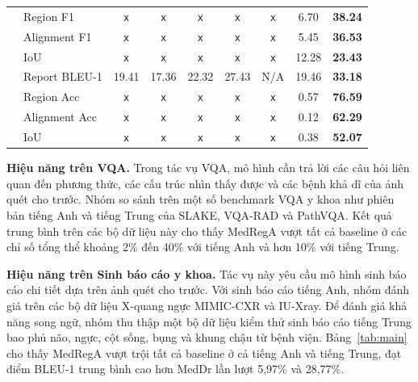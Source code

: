 \documentclass[12pt,a4paper,oneside]{extarticle}
\begin{document}
\begin{table}[H]
\begin{adjustbox}{max width=\textwidth}
\begin{tabular}{llccccccc}
 & Region F1    & \texttt{x} & \texttt{x} & \texttt{x} & \texttt{x} & \texttt{x} & 6.70  & \textbf{38.24} \\
 & Alignment F1 & \texttt{x} & \texttt{x} & \texttt{x} & \texttt{x} & \texttt{x} & 5.45  & \textbf{36.53} \\
 & IoU          & \texttt{x} & \texttt{x} & \texttt{x} & \texttt{x} & \texttt{x} & 12.28 & \textbf{23.43} \\
\midrule
{}
 & Report BLEU-1  & 19.41 & 17.36 & 22.32 & 27.43 & N/A & 19.46 & \textbf{33.18} \\
 & Region Acc     & \texttt{x} & \texttt{x} & \texttt{x} & \texttt{x} & \texttt{x} & 0.57 & \textbf{76.59} \\
 & Alignment Acc  & \texttt{x} & \texttt{x} & \texttt{x} & \texttt{x} & \texttt{x} & 0.12 & \textbf{62.29} \\
 & IoU            & \texttt{x} & \texttt{x} & \texttt{x} & \texttt{x} & \texttt{x} & 0.38 & \textbf{52.07} \\
\bottomrule
\end{tabular}
\end{adjustbox}
\end{table}

\noindent\textbf{Hiệu năng trên VQA.} Trong tác vụ VQA, mô hình cần trả lời các câu hỏi liên
quan đến phương thức, các cấu trúc nhìn thấy được và các bệnh khả dĩ của ảnh quét cho trước.
Nhóm so sánh trên một số benchmark VQA y khoa như phiên bản tiếng Anh và tiếng Trung của SLAKE,
VQA-RAD và PathVQA. Kết quả trung bình trên các bộ dữ liệu này cho thấy MedRegA vượt tất cả
baseline ở các chỉ số tổng thể khoảng 2\% đến 40\% với tiếng Anh và hơn 10\% với tiếng Trung.

\noindent\textbf{Hiệu năng trên Sinh báo cáo y khoa.} Tác vụ này yêu cầu mô hình sinh báo cáo
chi tiết dựa trên ảnh quét cho trước. Với sinh báo cáo tiếng Anh, nhóm đánh giá trên các bộ dữ
liệu X-quang ngực MIMIC-CXR và IU-Xray. Để đánh giá khả năng song ngữ, nhóm thu thập một bộ dữ
liệu kiểm thử sinh báo cáo tiếng Trung bao phủ não, ngực, cột sống, bụng và khung chậu từ bệnh
viện. Bảng~\ref{tab:main} cho thấy MedRegA vượt trội tất cả baseline ở cả tiếng Anh và tiếng
Trung, đạt điểm BLEU-1 trung bình cao hơn MedDr lần lượt 5,97\% và 28,77\%.
\end{document}
